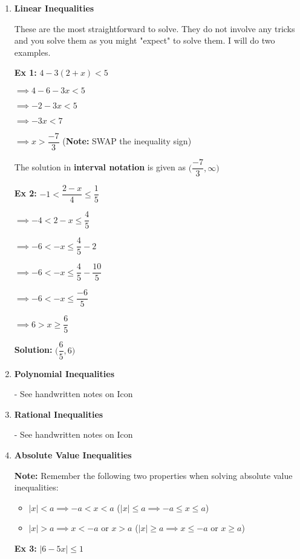 \documentclass[12pt]{article}
\begin{document}
\begin{enumerate}
\item \textbf{Linear Inequalities}

These are the most straightforward to solve. They do not involve any tricks and you solve them as you might "expect" to solve them. I will do two examples.

\textbf{Ex 1:} $4 - 3(2+x) < 5$

$\implies 4 - 6-3x < 5$

$\implies -2-3x < 5$

$\implies -3x < 7$

$\implies x > \dfrac{-7}{3}$ (\textbf{Note:} SWAP the inequality sign)

The solution in \textbf{interval notation} is given as $\Big(\dfrac{-7}{3}, \infty\Big)$

\textbf{Ex 2:} $-1 < \dfrac{2-x}{4} \leq \dfrac{1}{5}$

$\implies -4 < 2-x \leq \dfrac{4}{5}$

$\implies -6< -x \leq \dfrac{4}{5} - 2$

$\implies -6< -x \leq \dfrac{4}{5} - \dfrac{10}{5}$

$\implies -6< -x \leq \dfrac{-6}{5}$

$\implies 6> x \geq \dfrac{6}{5}$

\textbf{Solution:} $\Big(\dfrac{6}{5}, 6\Big)$
\item \textbf{Polynomial Inequalities}

- See handwritten notes on Icon

\item \textbf{Rational Inequalities}

- See handwritten notes on Icon

\item \textbf{Absolute Value Inequalities}

\textbf{Note:} Remember the following two properties when solving absolute value inequalities:

\begin{itemize}
\item $|x| < a \implies -a < x < a$ \hspace{1cm} ($|x| \leq a \implies -a \leq x \leq a$)
\item $|x| > a \implies x<-a$ or  $x>a$ \hspace{1cm} ($|x| \geq a \implies x\leq -a$ or  $x\geq a$)
\end{itemize}

\textbf{Ex 3:} $|6 - 5x| \leq 1$


\end{enumerate}
\end{document}

